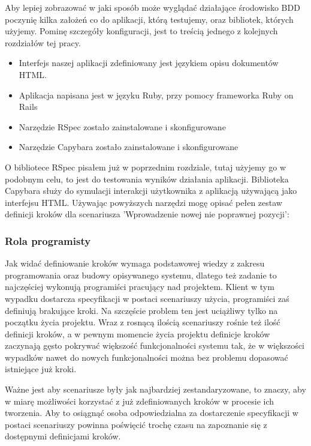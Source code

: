       Aby lepiej zobrazować w jaki sposób może wyglądać działające środowisko BDD poczynię kilka założeń co do aplikacji, którą testujemy, oraz bibliotek, których użyjemy. Pominę szczegóły konfiguracji, jest to treścią jednego z kolejnych rozdziałów tej pracy.
      
      \begin{itemize}
        \item Interfejs naszej aplikacji zdefiniowany jest językiem opisu dokumentów HTML.
        \item Aplikacja napisana jest w języku Ruby, przy pomocy frameworka Ruby on Rails
        \item Narzędzie RSpec zostało zainstalowane i skonfigurowane
        \item Narzędzie Capybara zostało zainstalowane i skonfigurowane
      \end{itemize}
      
      O bibliotece RSpec pisałem już w poprzednim rozdziale, tutaj użyjemy go w podobnym celu, to jest do testowania wyników działania aplikacji. Biblioteka Capybara służy do symulacji interakcji użytkownika z aplikacją używającą jako interfejsu HTML. Używając powyższych narzędzi mogę opisać pełen zestaw definicji kroków dla scenariusza 'Wprowadzenie nowej nie poprawnej pozycji':
      
      
      
    \subsubsection{Rola programisty}
    
      Jak widać definiowanie kroków wymaga podstawowej wiedzy z zakresu programowania oraz budowy opisywanego systemu, dlatego też zadanie to najczęściej wykonują programiści pracujący nad projektem.  Klient w tym wypadku dostarcza specyfikacji w postaci scenariuszy użycia, programiści zaś definiują brakujące kroki. Na szczęście problem ten jest uciążliwy tylko na początku życia projektu. Wraz z rosnącą ilością scenariuszy rośnie też ilość definicji kroków, a w pewnym momencie życia projektu definicje kroków zaczynają gęsto pokrywać większość funkcjonalności systemu tak, że w większości wypadków nawet do nowych funkcjonalności można bez problemu dopasować istniejące już kroki.
      
      Ważne jest aby scenariusze były jak najbardziej zestandaryzowane, to znaczy, aby w miarę możliwości korzystać z już zdefiniowanych kroków w procesie ich tworzenia. Aby to osiągnąć osoba odpowiedzialna  za dostarczenie specyfikacji w postaci scenariuszy powinna poświęcić trochę czasu na zapoznanie się z dostępnymi definicjami kroków.
      
